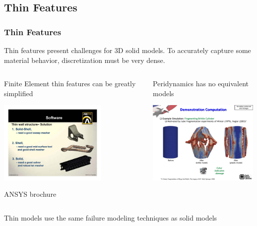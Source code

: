 \documentclass{beamer}
\begin{document}
\subsection{Thin Features}
%
\begin{frame}
  \frametitle{Thin Features}
  Thin features present challenges for 3D solid models. 
  To accurately capture some material behavior, discretization must be very dense.
     \vspace{0.3cm}
  
     \begin{columns}[t] %
       \begin{column}[T]{5cm} %
       \centering
       Finite Element thin features can be greatly simplified
       
       \includegraphics[height = 4cm]{ansysShell}
       
       \tiny{ANSYS brochure}
     
     \end{column}
     \begin{column}[T]{5cm} %
       \centering
       Peridynamics has no equivalent models
       
       \includegraphics[height = 4cm,clip=true,trim= 15cm 1.5cm 0cm 0]{LittlewoodCylinder}
       \footnotemark
     \end{column}
     \end{columns}
     Thin models use the same failure modeling techniques as solid models
     

\end{frame}
%
%
\end{document}
